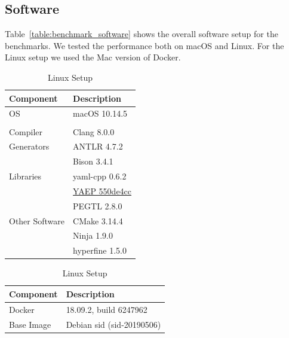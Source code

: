 \subsection{Software}

Table~\ref{table:benchmark_software} shows the overall software setup for the benchmarks. We tested the performance both on macOS and Linux. For the Linux setup we used the Mac version of Docker.

\begin{table}[H]
    \newcommand{\YAEP}{{\href{https://github.com/vnmakarov/yaep/commit/550de4cc5600d5f6109c7ebcfbacec51bf80d8d3}{YAEP 550de4cc}}}
    \caption{Software Setup}
    \label{table:benchmark_software}
    \begin{subtable}[t]{.45\linewidth}
      \centering
        \caption{Mac Setup}
        \label{table:benchmark_mac}
        \begin{tabular}{ll}
\toprule
\textbf{Component} & \textbf{Description}\\
\midrule
                OS &        macOS 10.14.5\\
                   &                     \\
\midrule
          Compiler &          Clang 8.0.0\\
        Generators &          ANTLR 4.7.2\\
                   &          Bison 3.4.1\\
         Libraries &       yaml-cpp 0.6.2\\
                   &                \YAEP\\
                   &          PEGTL 2.8.0\\
    Other Software &         CMake 3.14.4\\
                   &          Ninja 1.9.0\\
                   &      hyperfine 1.5.0\\
\bottomrule
        \end{tabular}
    \end{subtable}
    \begin{subtable}[t]{.45\linewidth}
      \centering
        \caption{Linux Setup}
        \label{table:benchmark_docker}
        \begin{tabular}{ll}
\toprule
\textbf{Component} &      \textbf{Description}\\
\midrule
            Docker &    18.09.2, build 6247962\\
        Base Image & Debian sid (sid-20190506)\\

\end{tabular}
\end{subtable}
\end{table}
